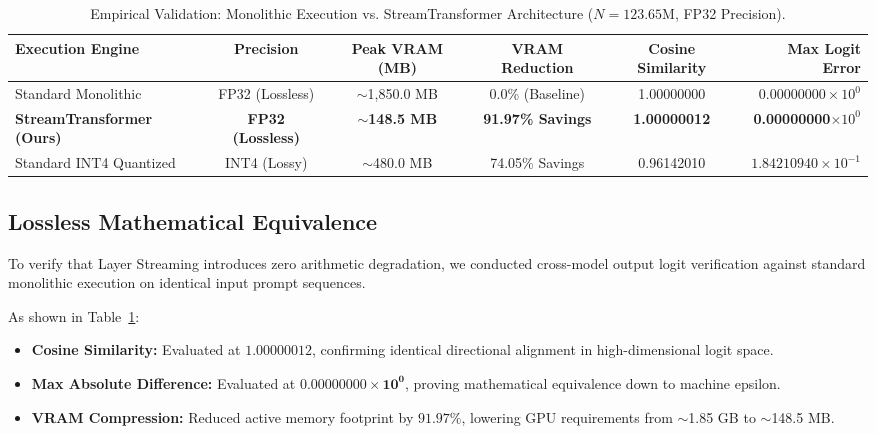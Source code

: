 \documentclass[10pt,twocolumn,a4paper]{article}
\begin{document}
\begin{table}[t]
\centering
\small
\caption{Empirical Validation: Monolithic Execution vs. StreamTransformer Architecture ($N=123.65\text{M}$, FP32 Precision).}
\label{tab:streaming_benchmark}
\begin{tabular}{lccccr}
\toprule
\textbf{Execution Engine} & \textbf{Precision} & \textbf{Peak VRAM (MB)} & \textbf{VRAM Reduction} & \textbf{Cosine Similarity} & \textbf{Max Logit Error} \\
\midrule
Standard Monolithic & FP32 (Lossless) & $\sim$1,850.0 MB & 0.0\% (Baseline) & 1.00000000 & $0.00000000\times 10^0$ \\
\textbf{StreamTransformer (Ours)} & \textbf{FP32 (Lossless)} & \textbf{$\sim$148.5 MB} & \textbf{91.97\% Savings} & \textbf{1.00000012} & \textbf{0.00000000}$\times 10^0$ \\
Standard INT4 Quantized & INT4 (Lossy) & $\sim$480.0 MB & 74.05\% Savings & 0.96142010 & $1.84210940\times 10^{-1}$ \\
\bottomrule
\end{tabular}
\end{table}

\subsection{Lossless Mathematical Equivalence}
To verify that Layer Streaming introduces zero arithmetic degradation, we conducted cross-model output logit verification against standard monolithic execution on identical input prompt sequences.

As shown in Table~\ref{tab:streaming_benchmark}:
\begin{itemize}
    \item \textbf{Cosine Similarity:} Evaluated at $\mathbf{1.00000012}$, confirming identical directional alignment in high-dimensional logit space.
    \item \textbf{Max Absolute Difference:} Evaluated at $\mathbf{0.00000000\times 10^0}$, proving mathematical equivalence down to machine epsilon.
    \item \textbf{VRAM Compression:} Reduced active memory footprint by $\mathbf{91.97\%}$, lowering GPU requirements from $\sim$1.85 GB to $\sim$148.5 MB.
\end{itemize}
\end{document}
